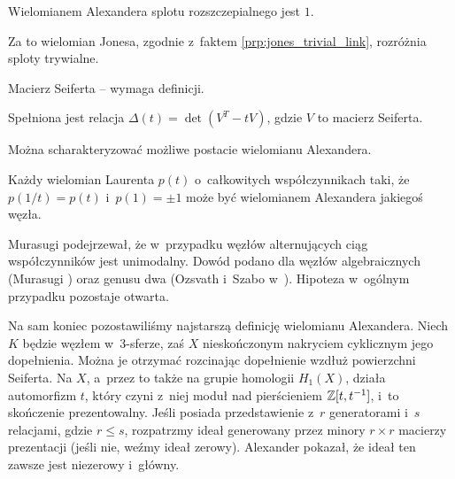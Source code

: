 \begin{proposition}
    Wielomianem Alexandera splotu rozszczepialnego jest $1$.
\end{proposition}

Za to wielomian Jonesa, zgodnie z~faktem \ref{prp:jones_trivial_link}, rozróżnia sploty trywialne.

Macierz Seiferta -- wymaga definicji.
\begin{proposition}
    Spełniona jest relacja $\Delta(t)=\det(V^T-tV)$, gdzie $V$ to macierz Seiferta.
\end{proposition}

Można scharakteryzować możliwe postacie wielomianu Alexandera.

\begin{proposition}[Hosokowa, 1958]
    Każdy wielomian Laurenta $p(t)$ o~całkowitych współczynnikach taki, że $p(1/t) = p(t)$ i~$p(1) = \pm 1$ może być wielomianem Alexandera jakiegoś węzła.
\end{proposition}

Murasugi podejrzewał, że w~przypadku węzłów alternujących ciąg współczynników jest unimodalny.
Dowód podano dla węzłów algebraicznych (Murasugi \cite{murasugi85}) oraz genusu dwa (Ozsvath i~Szabo w~\cite{ozsvath03}).
Hipoteza w~ogólnym przypadku pozostaje otwarta.


Na sam koniec pozostawiliśmy najstarszą definicję wielomianu Alexandera.
Niech $K$ będzie węzłem w~3-sferze, zaś $X$ nieskończonym nakryciem cyklicznym jego dopełnienia.
Można je otrzymać rozcinając dopełnienie wzdłuż powierzchni Seiferta.
Na $X$, a~przez to także na grupie homologii $H_1(X)$, działa automorfizm $t$, który czyni z~niej moduł nad pierścieniem $\mathbb Z[t, t^{-1}]$, i~to skończenie prezentowalny.
Jeśli posiada przedstawienie z~$r$ generatorami i~$s$ relacjami, gdzie $r \le s$, rozpatrzmy ideał generowany przez minory $r \times r$ macierzy prezentacji (jeśli nie, weźmy ideał zerowy).
Alexander pokazał, że ideał ten zawsze jest niezerowy i~główny.

